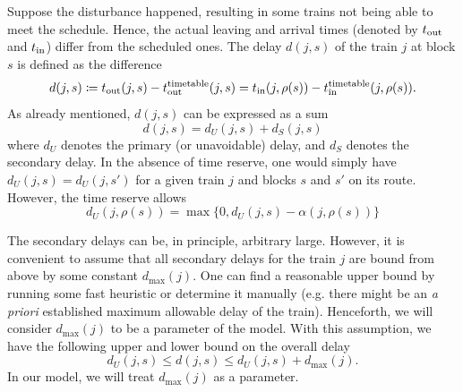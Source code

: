 Suppose the disturbance happened, resulting in some trains not being able to meet the schedule.
Hence, the actual leaving and arrival times (denoted by $t_\text{out}$ and $t_\text{in}$) differ from the
scheduled ones. The delay $d(j, s)$ of the train $j$ at block $s$ is defined as the difference
\begin{equation}
	\label{eq:djs}
	d(j, s) \coloneqq t_\text{out}(j, s) - t_\text{out}^\text{timetable}(j, s) = t_\text{in}(j, \rho(s)) - t_\text{in}^\text{timetable}(j, \rho(s)).
\end{equation}
As already mentioned, $d(j, s)$ can be expressed as a sum
\begin{equation}
	d(j, s) = d_U(j, s) + d_S(j, s)
\end{equation}
where $d_U$ denotes the primary (or unavoidable) delay, and $d_S$ denotes the secondary delay.  In
the absence of time reserve, one would simply have $d_U(j, s) = d_U(j, s')$ for a given train $j$
and blocks $s$ and $s'$ on its route. However, the time reserve allows
\begin{equation}
	d_U(j, \rho(s)) = \max\{0, d_U(j, s) - \alpha(j, \rho(s))\}
\end{equation}

The secondary delays can be, in principle, arbitrary large. However, it is convenient to assume that
all secondary delays for the train $j$ are bound from above by some constant $d_{\max}(j)$. One can find
a reasonable upper bound by running some fast heuristic or determine it manually (e.g. there might
be an \emph{a priori} established maximum allowable delay of the train). Henceforth, we will consider
$d_{\max}(j)$ to be a parameter of the model. With this assumption, we have the following upper and
lower bound on the overall delay
\begin{equation}
	d_U(j, s) \le d(j, s) \le d_U(j, s) + d_{\max}(j).
\end{equation}
In our model, we will treat $d_{\max}(j)$ as a parameter.

